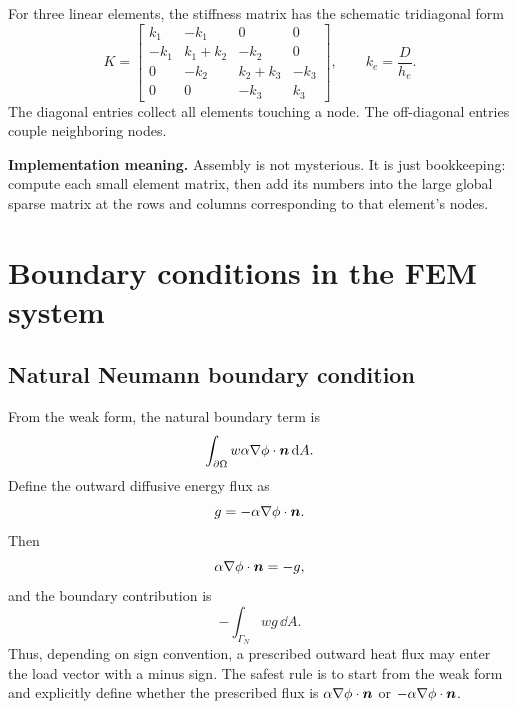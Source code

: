 \documentclass[11pt]{article}
\begin{document}
For three linear elements, the stiffness matrix has the schematic tridiagonal form
\begin{equation}
    K=\begin{bmatrix}
    k_1 & -k_1 & 0 & 0\\
    -k_1 & k_1+k_2 & -k_2 & 0\\
    0 & -k_2 & k_2+k_3 & -k_3\\
    0 & 0 & -k_3 & k_3
    \end{bmatrix},
    \qquad
    k_e=\frac{D}{h_e}.
\end{equation}
The diagonal entries collect all elements touching a node. The off-diagonal entries couple neighboring nodes.

\begin{notebox}
\textbf{Implementation meaning.} Assembly is not mysterious. It is just bookkeeping: compute each small element matrix, then add its numbers into the large global sparse matrix at the rows and columns corresponding to that element's nodes.
\end{notebox}

\section{Boundary conditions in the FEM system}
\subsection{Natural Neumann boundary condition}
From the weak form, the natural boundary term is
\begin{equation}
    \int_{\partial\Omega}w\alpha\nabla\phi\cdot\bm{n}\,\dd A.
\end{equation}
Define the outward diffusive energy flux as
\begin{equation}
    g=-\alpha\nabla\phi\cdot\bm{n}.
\end{equation}
Then
\begin{equation}
    \alpha\nabla\phi\cdot\bm{n}=-g,
\end{equation}
and the boundary contribution is
\begin{equation}
    -\int_{\Gamma_N}w g\,\dd A.
\end{equation}
Thus, depending on sign convention, a prescribed outward heat flux may enter the load vector with a minus sign. The safest rule is to start from the weak form and explicitly define whether the prescribed flux is \(\alpha\nabla\phi\cdot\bm{n}\) or \(-\alpha\nabla\phi\cdot\bm{n}\).
\end{document}
